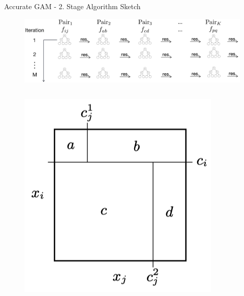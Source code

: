 \documentclass[11pt,compress,t,notes=noshow, aspectratio=169, xcolor=table]{beamer}
\begin{document}
\begin{frame}{Accurate GAM - 2. Stage Algorithm Sketch}
\begin{figure}
    \centering
    \includegraphics[width=1\linewidth]{slides//02_interpretable-models//figure/GA2M_Step1.png}
    \label{fig:GA2M_Step1}
\end{figure}
\begin{columns}[T, totalwidth=\textwidth]
    \begin{column}{0.4\textwidth} 
        \begin{figure}
            \vspace{-1.35cm} 
            \hspace{-0.8cm} 
            \includegraphics[width=0.8\linewidth]{slides/02_interpretable-models/figure/GA2M_Step0.png}
            \label{fig:GA2M_predictor}
        \end{figure}
    \end{column}
    \hfill
    \begin{column}{0.7\textwidth}
        \begin{itemize}
            \setlength{\leftskip}{-0.7cm}
            \vspace{-0.8cm}

\end{itemize}
\end{column}
\end{columns}
\end{frame}
\end{document}
